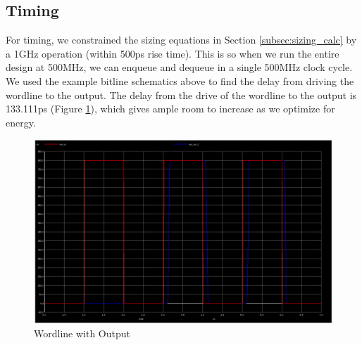 \documentclass[a4paper]{article}
\begin{document}
\subsection{Timing}
For timing, we constrained the sizing equations in Section \ref{subsec:sizing_calc} by a 1GHz operation (within 500ps rise time). This is so when we run the entire design at 500MHz, we can enqueue and dequeue in a single 500MHz clock cycle. We used the example bitline schematics above to find the delay from driving the wordline to the output. The delay from the drive of the wordline to the output is 133.111ps (Figure \ref{fig:ioTiming}), which gives ample room to increase as we optimize for energy.

\begin{figure}[H]
	\centering
	\includegraphics[scale=0.2]{exampleBitlineIOTiming}
	\caption{Wordline with Output}
	\label{fig:ioTiming}
\end{figure}



\end{document}
